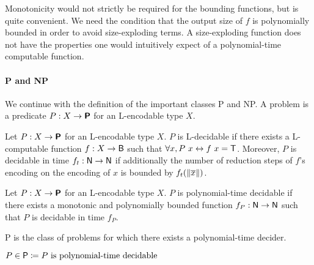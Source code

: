 Monotonicity would not strictly be required for the bounding functions, but is quite convenient. We need the condition that the output size of $f$ is polynomially bounded in order to avoid size-exploding terms. A size-exploding function does not have the properties one would intuitively expect of a polynomial-time computable function.

\paragraph{\textsf{P} and \textsf{NP}}
We continue with the definition of the important classes \textsf{P} and \textsf{NP}. 
A problem is a predicate $P : X \rightarrow \textsf{\bfseries P}$ for an L-encodable type $X$.
\begin{definition}
  Let $P : X \rightarrow \textsf{\bfseries P}$ for an L-encodable type $X$. $P$ is L-decidable if there exists a L-computable function $f : X \rightarrow \textsf{B}$ such that 
  $\forall x, P~x \leftrightarrow f~x = \mathsf{T}$. 
  Moreover, $P$ is decidable in time $f_t : \mathsf{N} \rightarrow \mathsf{N}$ if additionally the number of reduction steps of $f$'s encoding on the encoding of $x$ is bounded by $f_t(\left\lVert\overline{x}\right\rVert)$.
\end{definition}

\begin{definition}
  Let $P : X \rightarrow \textsf{\bfseries P}$ for an L-encodable type $X$. $P$ is polynomial-time decidable if there exists a monotonic and polynomially bounded function $f_P : \mathsf{N} \rightarrow \mathsf{N}$ such that $P$ is decidable in time $f_P$. 
\end{definition}

\textsf{P} is the class of problems for which there exists a polynomial-time decider. 
\begin{definition}[\textsf{P}]
  $P \in \normalfont{\textsf{P}} \coloneqq P \text{ is polynomial-time decidable} $
\end{definition}

